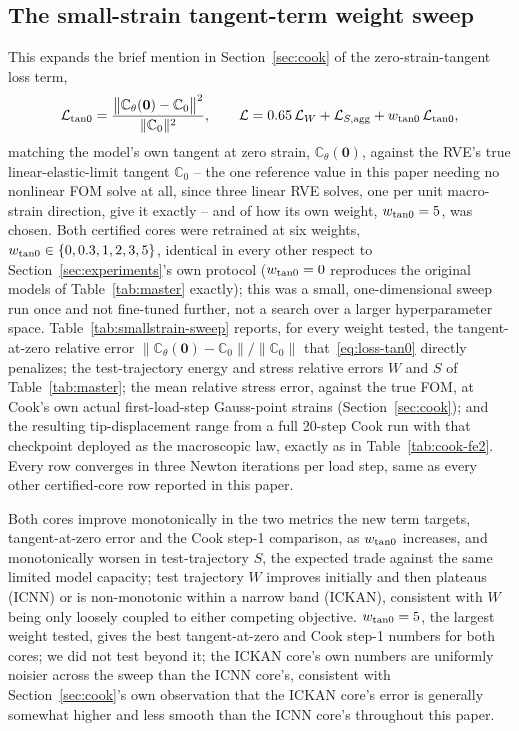\documentclass[10pt,a4paper]{article}
\begin{document}
\subsection{The small-strain tangent-term weight sweep}
\label{app:smallstrain-sweep}
This expands the brief mention in Section~\ref{sec:cook} of the
zero-strain-tangent loss term,
\begin{equation}
 \mathcal L_{\rm tan0}=\frac{\big\|\mathbb C_\theta(\bm 0)-\mathbb
 C_0\big\|^2}{\|\mathbb C_0\|^2},\qquad
 \mathcal L=0.65\,\mathcal L_W+\mathcal L_{S,\rm agg}+w_{\rm tan0}\,\mathcal L_{\rm tan0},
 \label{eq:loss-tan0}
\end{equation}
matching the model's own tangent at zero strain, $\mathbb C_\theta(\bm
0)$, against the RVE's true linear-elastic-limit tangent $\mathbb C_0$ --
the one reference value in this paper needing no nonlinear FOM solve at
all, since three linear RVE solves, one per unit macro-strain direction,
give it exactly -- and of how its own weight, $w_{\rm tan0}=5$, was
chosen. Both certified cores
were retrained at six weights, $w_{\rm tan0}\in\{0,0.3,1,2,3,5\}$,
identical in every other respect to Section~\ref{sec:experiments}'s own
protocol ($w_{\rm tan0}=0$ reproduces the original models of
Table~\ref{tab:master} exactly); this was a small, one-dimensional sweep
run once and not fine-tuned further, not a search over a larger
hyperparameter space. Table~\ref{tab:smallstrain-sweep} reports, for
every weight tested, the tangent-at-zero relative error
$\big\|\mathbb C_\theta(\bm 0)-\mathbb C_0\big\|/\|\mathbb C_0\|$
that~\eqref{eq:loss-tan0} directly penalizes; the test-trajectory energy
and stress relative errors $W$ and $S$ of Table~\ref{tab:master}; the
mean relative stress error, against the true FOM, at Cook's own actual
first-load-step Gauss-point strains (Section~\ref{sec:cook}); and the
resulting tip-displacement range from a full
20-step Cook run with that checkpoint deployed as the macroscopic law,
exactly as in Table~\ref{tab:cook-fe2}. Every row converges in three
Newton iterations per load step, same as every other certified-core row
reported in this paper.

Both cores improve monotonically in the two metrics the new term
targets, tangent-at-zero error and the Cook step-1 comparison, as
$w_{\rm tan0}$ increases, and monotonically worsen in test-trajectory
$S$, the expected trade against the same limited model capacity; test
trajectory $W$ improves initially and then plateaus (ICNN) or is
non-monotonic within a narrow band (ICKAN), consistent with $W$ being
only loosely coupled to either competing objective. $w_{\rm tan0}=5$,
the largest weight tested, gives the best tangent-at-zero and Cook
step-1 numbers for both cores; we did not test beyond it; the ICKAN
core's own numbers are uniformly noisier across the sweep than the
ICNN core's, consistent with Section~\ref{sec:cook}'s own observation
that the ICKAN core's error is generally somewhat higher and less
smooth than the ICNN core's throughout this paper.
\end{document}
